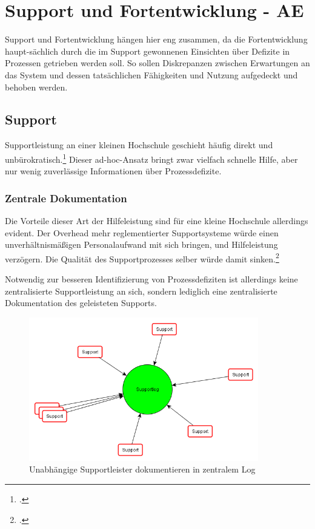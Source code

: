 \section{Support und Fortentwicklung - AE}
Support und Fortentwicklung hängen hier eng zusammen, da die Fortentwicklung 
haupt-sächlich durch die im Support gewonnenen Einsichten über Defizite in Prozessen 
getrieben werden soll. So sollen Diskrepanzen zwischen Erwartungen an das System und 
dessen tatsächlichen Fähigkeiten und Nutzung aufgedeckt und behoben werden.

\subsection{Support}
Supportleistung an einer kleinen Hochschule geschieht häufig direkt und 
unbürokratisch.\footcite{gunter_muller_interview} Dieser ad-hoc-Ansatz bringt 
zwar vielfach schnelle Hilfe, aber nur wenig zuverlässige Informationen über Prozessdefizite.

\subsubsection{Zentrale Dokumentation}
Die Vorteile dieser Art der Hilfeleistung sind für eine kleine Hochschule allerdings evident. 
Der Overhead mehr reglementierter Supportsysteme würde einen unverhältnismäßigen 
Personalaufwand mit sich bringen, und Hilfeleistung verzögern. Die Qualität des 
Supportprozesses selber würde damit sinken.\footcite{gunter_muller_interview}

Notwendig zur besseren Identifizierung von Prozessdefiziten ist allerdings keine 
zentralisierte Supportleistung an sich, sondern lediglich eine zentralisierte Dokumentation 
des geleisteten Supports.
\newpage

\begin{figure}[h!]
	\centering
	\includegraphics[width=10cm]{kapitel/gruppe3/bilder/grafik_supportlog}
	\caption{Unabhängige Supportleister dokumentieren in zentralem Log}
	\label{fig_zentraler_supportlog}
\end{figure}

